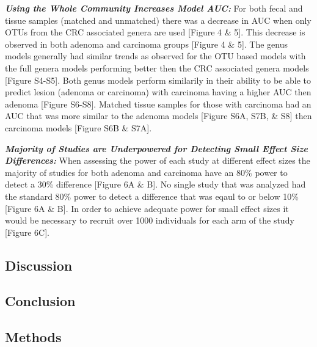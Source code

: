 \documentclass[12pt,]{article}
\begin{document}
\textbf{\emph{Using the Whole Community Increases Model AUC:}} For both
fecal and tissue samples (matched and unmatched) there was a decrease in
AUC when only OTUs from the CRC associated genera are used {[}Figure 4
\& 5{]}. This decrease is observed in both adenoma and carcinoma groups
{[}Figure 4 \& 5{]}. The genus models generally had similar trends as
observed for the OTU based models with the full genera models performing
better then the CRC associated genera models {[}Figure S4-S5{]}. Both
genus models perform similarily in their ability to be able to predict
lesion (adenoma or carcinoma) with carcinoma having a higher AUC then
adenoma {[}Figure S6-S8{]}. Matched tissue samples for those with
carcinoma had an AUC that was more similar to the adenoma models
{[}Figure S6A, S7B, \& S8{]} then carcinoma models {[}Figure S6B \&
S7A{]}.

\textbf{\emph{Majority of Studies are Underpowered for Detecting Small
Effect Size Differences:}} When assessing the power of each study at
different effect sizes the majority of studies for both adenoma and
carcinoma have an 80\% power to detect a 30\% difference {[}Figure 6A \&
B{]}. No single study that was analyzed had the standard 80\% power to
detect a difference that was eqaul to or below 10\% {[}Figure 6A \&
B{]}. In order to achieve adequate power for small effect sizes it would
be necessary to recruit over 1000 individuals for each arm of the study
{[}Figure 6C{]}.

\newpage

\subsection{Discussion}\label{discussion}

\subsection{Conclusion}\label{conclusion}

\newpage

\subsection{Methods}\label{methods}
\end{document}

